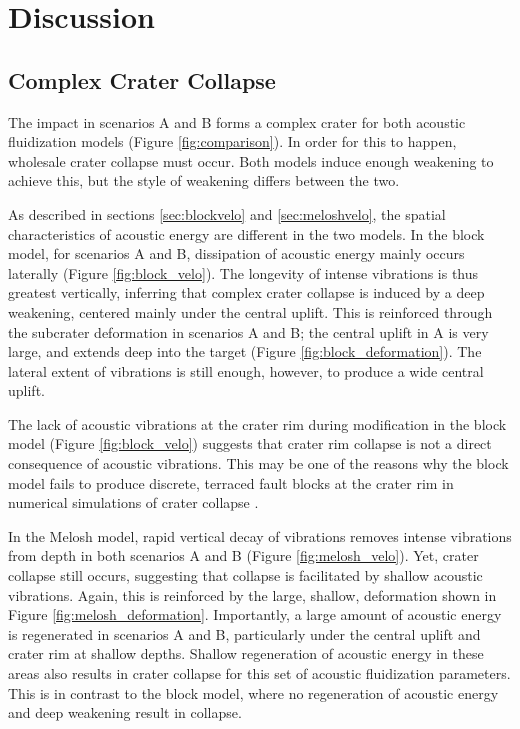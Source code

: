 \section{Discussion \label{sec:discussion}}

\subsection{Complex Crater Collapse} 

The impact in scenarios A and B forms a complex crater for both acoustic fluidization models (Figure \ref{fig:comparison}). In order for this to happen, wholesale crater collapse must occur. Both models induce enough weakening to achieve this, but the style of weakening differs between the two.

As described in sections \ref{sec:blockvelo} and \ref{sec:meloshvelo}, the spatial characteristics of acoustic energy are different in the two models. In the block model, for scenarios A and B, dissipation of acoustic energy mainly occurs laterally (Figure \ref{fig:block_velo}). The longevity of intense vibrations is thus greatest vertically, inferring that complex crater collapse is induced by a deep weakening, centered mainly under the central uplift. This is reinforced through the subcrater deformation in scenarios A and B; the central uplift in A is very large, and extends deep into the target (Figure \ref{fig:block_deformation}). The lateral extent of vibrations is still enough, however, to produce a wide central uplift. 

The lack of acoustic vibrations at the crater rim during modification in the block model (Figure \ref{fig:block_velo}) suggests that crater rim collapse is not a direct consequence of acoustic vibrations. This may be one of the reasons why the block model fails to produce discrete, terraced fault blocks at the crater rim in numerical simulations of crater collapse \citep{kenkmann2012modification}.

In the Melosh model, rapid vertical decay of vibrations removes intense vibrations from depth  in both scenarios A and B (Figure \ref{fig:melosh_velo}). Yet, crater collapse still occurs, suggesting that collapse is facilitated by shallow acoustic vibrations. Again, this is reinforced by the large, shallow, deformation shown in Figure \ref{fig:melosh_deformation}. Importantly, a large amount of acoustic energy is regenerated in scenarios A and B, particularly under the central uplift and crater rim at shallow depths. Shallow regeneration of acoustic energy in these areas also results in crater collapse for this set of acoustic fluidization parameters. This is in contrast to the block model, where no regeneration of acoustic energy and deep weakening result in collapse.

